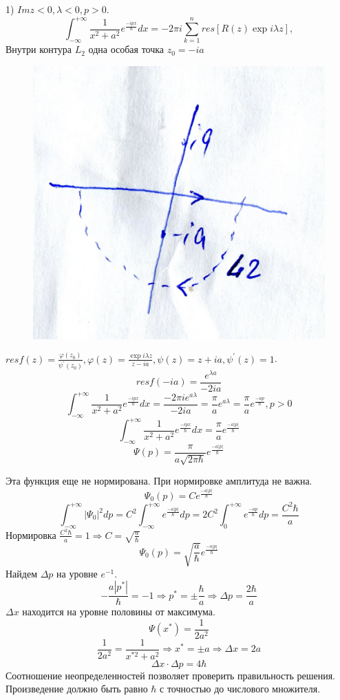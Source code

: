 1) $Im z<0, \lambda <0, p>0$.
$$\int_{-\infty}^{+\infty} \frac{1}{x^2+a^2} e^{\frac{-ipx}{\hbar}}dx=-2\pi i \sum_{k=1}^n res [R(z)\exp{i \lambda z}],$$
Внутри контура $L_2$ одна особая точка $z_0=-ia$

\begin{figure}
\includegraphics[width=\linewidth]{fig/fig831}
\caption{}
\vspace{-17pt}
\end{figure}

$res f(z) = \frac{\varphi(z_0)}{\psi^{'}(z_0)}, \varphi(z)=\frac{\exp{i \lambda z}}{z-ia}, \psi(z)=z+ia, \psi^{'}(z)=1$.
$$res f(-ia) = \frac{e^{\lambda a}}{-2ia}$$
$$\int_{-\infty}^{+\infty} \frac{1}{x^2+a^2} e^{\frac{-ipx}{\hbar}}dx=\frac{-2\pi i e^{a\lambda}}{-2ia}=\frac{\pi}{a} e^{a\lambda}=\frac{\pi}{a} e^{\frac{-ap}{\hbar}}, p>0$$
$$\int_{-\infty}^{+\infty} \frac{1}{x^2+a^2} e^{\frac{-ipx}{\hbar}}dx=\frac{\pi}{a} e^{\frac{-a|p|}{\hbar}}$$
$$\Psi(p)=\frac{\pi}{a\sqrt{2\pi \hbar}}e^{\frac{-a|p|}{\hbar}}$$

Эта функция еще не нормирована. При нормировке амплитуда не важна.
 $$\Psi_0(p)=C e^{\frac{-a|p|}{\hbar}}$$
 $$\int_{-\infty}^{+\infty} |\Psi_0|^2 dp=C^2 \int_{-\infty}^{+\infty}e^{\frac{-a|p|}{\hbar}} dp= 2C^2 \int_{0}^{+\infty}e^{\frac{-ap}{\hbar}}dp=\frac{C^2\hbar}{a}$$
 Нормировка $\frac{C^2\hbar}{a}=1 \Longrightarrow C=\sqrt{\frac{a}{\hbar}}$ 
 $$\Psi_0(p)=\sqrt{\frac{a}{\hbar}} e^{\frac{-a|p|}{\hbar}}$$
 Найдем $\Delta p$ на уровне $e^{-1}$.
 $$-\frac{a|p^*|}{\hbar}=-1 \Longrightarrow p^*=\pm \frac{\hbar}{a} \Longrightarrow \Delta p=\frac{2\hbar}{a}$$
$\Delta x$ находится на уровне половины от максимума.
$$\Psi(x^*)=\frac{1}{2a^2}$$
$$\frac{1}{2a^2}=\frac{1}{x^{*2}+a^2} \Longrightarrow x^*=\pm a \Longrightarrow \Delta x=2a$$
$$\Delta x \cdot \Delta p= 4\hbar$$
 Соотношение неопределенностей позволяет проверить правильность решения. Произведение должно быть равно $\hbar$ с точностью до числового множителя.

